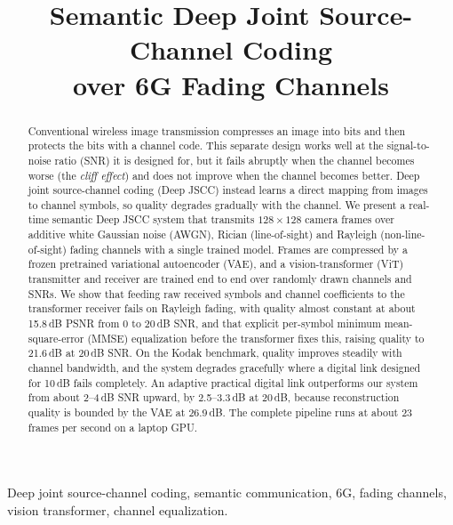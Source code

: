 \documentclass[conference]{IEEEtran}
\begin{document}
\title{Semantic Deep Joint Source-Channel Coding\\over 6G Fading Channels}

\author{
}

\maketitle

\begin{abstract}
Conventional wireless image transmission compresses an image into bits and then protects the bits with a channel code. This separate design works well at the signal-to-noise ratio (SNR) it is designed for, but it fails abruptly when the channel becomes worse (the \emph{cliff effect}) and does not improve when the channel becomes better. Deep joint source-channel coding (Deep JSCC) instead learns a direct mapping from images to channel symbols, so quality degrades gradually with the channel. We present a real-time semantic Deep JSCC system that transmits $128\times128$ camera frames over additive white Gaussian noise (AWGN), Rician (line-of-sight) and Rayleigh (non-line-of-sight) fading channels with a single trained model. Frames are compressed by a frozen pretrained variational autoencoder (VAE), and a vision-transformer (ViT) transmitter and receiver are trained end to end over randomly drawn channels and SNRs. We show that feeding raw received symbols and channel coefficients to the transformer receiver fails on Rayleigh fading, with quality almost constant at about 15.8\,dB PSNR from 0 to 20\,dB SNR, and that explicit per-symbol minimum mean-square-error (MMSE) equalization before the transformer fixes this, raising quality to 21.6\,dB at 20\,dB SNR. On the Kodak benchmark, quality improves steadily with channel bandwidth, and the system degrades gracefully where a digital link designed for 10\,dB fails completely. An adaptive practical digital link outperforms our system from about 2--4\,dB SNR upward, by 2.5--3.3\,dB at 20\,dB, because reconstruction quality is bounded by the VAE at 26.9\,dB. The complete pipeline runs at about 23 frames per second on a laptop GPU.
\end{abstract}

\begin{IEEEkeywords}
Deep joint source-channel coding, semantic communication, 6G, fading channels, vision transformer, channel equalization.
\end{IEEEkeywords}
\end{document}
